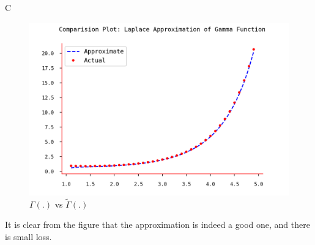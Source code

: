 \documentclass{article}
\begin{document}
\begin{question}
\begin{qpart}{C}
		\begin{figure}[h!]
			\centering
			\includegraphics{plots/q3.png}
			\caption{$\Gamma(.)$ vs $\widetilde{\Gamma}(.)$}
			\label{fig:q3}
		\end{figure}

		It is clear from the figure that the approximation is indeed a good one, and there is small loss.

	\end{qpart}

\end{question}
\end{document}
